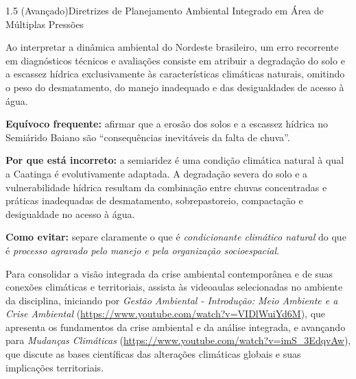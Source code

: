 \begin{boxExemplo}{1.5 (Avançado)}{Diretrizes de Planejamento Ambiental Integrado em Área de Múltiplas Pressões}
\end{boxExemplo}


Ao interpretar a dinâmica ambiental do Nordeste brasileiro, um erro recorrente em diagnósticos técnicos e avaliações consiste em atribuir a degradação do solo e a escassez hídrica exclusivamente às características climáticas naturais, omitindo o peso do desmatamento, do manejo inadequado e das desigualdades de acesso à água.

\begin{boxErro}
\textbf{Equívoco frequente:} afirmar que a erosão dos solos e a escassez hídrica no Semiárido Baiano são ``consequências inevitáveis da falta de chuva''.

\textbf{Por que está incorreto:} a semiaridez é uma condição climática natural à qual a Caatinga é evolutivamente adaptada. A degradação severa do solo e a vulnerabilidade hídrica resultam da combinação entre chuvas concentradas e práticas inadequadas de desmatamento, sobrepastoreio, compactação e desigualdade no acesso à água.

\textbf{Como evitar:} separe claramente o que é \emph{condicionante climático natural} do que é \emph{processo agravado pelo manejo e pela organização socioespacial}.
\end{boxErro}

Para consolidar a visão integrada da crise ambiental contemporânea e de suas conexões climáticas e territoriais, assista às videoaulas selecionadas no ambiente da disciplina, iniciando por \textit{Gestão Ambiental - Introdução: Meio Ambiente e a Crise Ambiental} (\url{https://www.youtube.com/watch?v=VIDlWuiYd6M}), que apresenta os fundamentos da crise ambiental e da análise integrada, e avançando para \textit{Mudanças Climáticas} (\url{https://www.youtube.com/watch?v=imS_3EdqvAw}), que discute as bases científicas das alterações climáticas globais e suas implicações territoriais.

